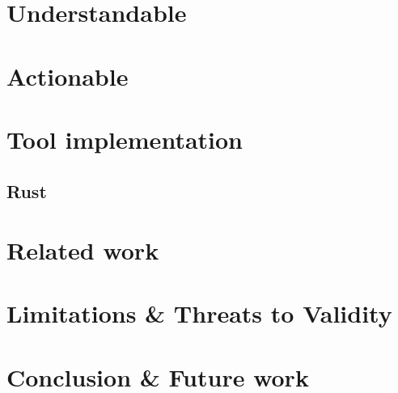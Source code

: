 \documentclass[runningheads]{llncs}
\begin{document}
\section{Understandable}
\section{Actionable}

\section{Tool implementation}
\subsection{Rust}

\section{Related work}


\cite{krauterFormalizationAnalysisBPMN2023}

\cite{vangorpVisualTokenbasedFormalization2013}

\cite{corradiniBProVeToolSupport2017,corradiniFormalApproachAnalysis2021}

\section{Limitations \& Threats to Validity}

\section{Conclusion \& Future work}

 

\end{document}
